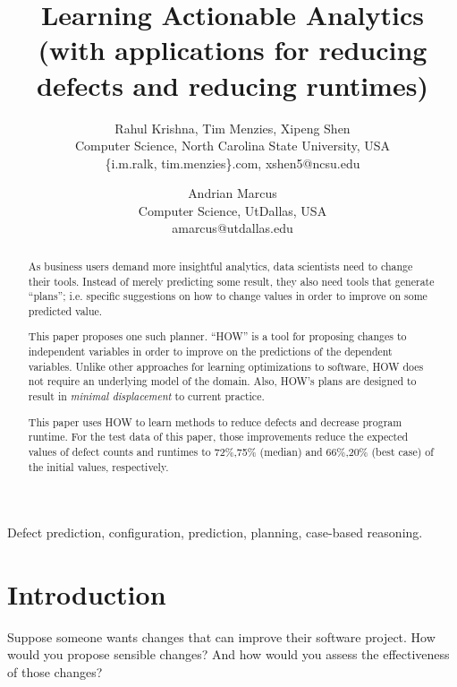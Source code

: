 \documentclass[conference]{IEEEtran}
\title{Learning Actionable Analytics 
 (with applications for reducing defects and reducing runtimes)}
\author{
%
%
Rahul Krishna, Tim Menzies, Xipeng Shen\\
        Computer Science, North Carolina State University, USA\\
       \{i.m.ralk, tim.menzies\}\@gmail.com, xshen5@ncsu.edu
\and
 Andrian Marcus\\
       Computer Science, UtDallas, USA \\
       amarcus@utdallas.edu }
\begin{document}
  \maketitle
  
  
   
  \begin{abstract}
 As business users demand more insightful
 analytics, data scientists need to change
 their tools. Instead of merely predicting 
 some result, they also need tools that generate ``plans'';
 i.e. specific suggestions on  how to change values in order to
 improve on some predicted value.
 
 This paper proposes one such planner. ``HOW'' is a 
 tool for proposing changes to independent
 variables in order to improve on 
 the predictions of the dependent variables. Unlike other approaches
 for learning optimizations to software, HOW does not require
 an underlying model of the domain. Also, HOW's plans
 are designed to result in {\em minimal displacement}
 to current practice.
 
 This paper uses  HOW to learn methods
 to reduce defects and decrease program runtime.
 For the test data of this paper, those improvements   reduce
 the expected values of defect counts and  runtimes to    
 72\%,75\%  (median) and 66\%,20\% (best case) of the initial values, respectively.
  \end{abstract}
  \begin{IEEEkeywords}
Defect prediction, configuration, prediction, planning, case-based reasoning.
  \end{IEEEkeywords}
  
\section{Introduction}
Suppose someone wants changes that can improve their software project. How would you propose
sensible changes? And how would you assess the effectiveness of those changes?
\end{document}
